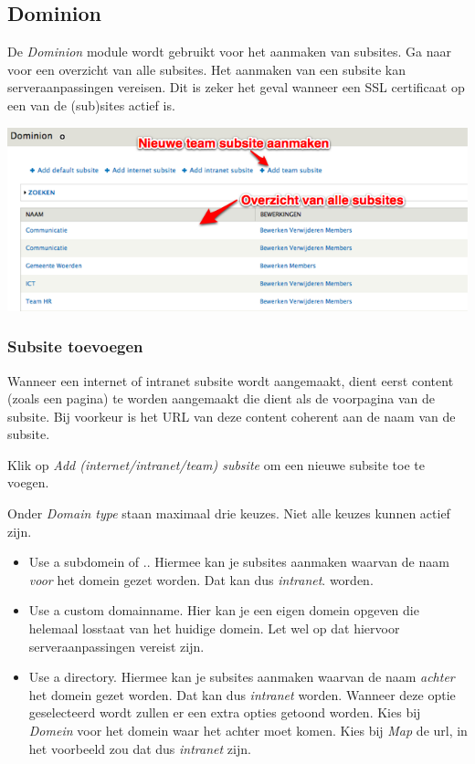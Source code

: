 \subsection{Dominion}\label{dominion}
De \emph{Dominion} module wordt gebruikt voor het aanmaken van subsites. Ga naar  voor een overzicht van alle subsites. Het aanmaken van een subsite kan serveraanpassingen vereisen. Dit is zeker het geval wanneer een SSL certificaat op een van de (sub)sites actief is.

\bigskip

\begin{center}
	\includegraphics[width=\textwidth]{img/dominion1.png}
\end{center}

\subsubsection{Subsite toevoegen}\label{teamsubsitetoevoegen}
Wanneer een internet of intranet subsite wordt aangemaakt, dient eerst content (zoals een pagina) te worden aangemaakt die dient als de voorpagina van de subsite. Bij voorkeur is het URL van deze content coherent aan de naam van de subsite.

Klik op \emph{Add (internet/intranet/team) subsite} om een nieuwe subsite toe te voegen.

Onder \emph{Domain type} staan maximaal drie keuzes. Niet alle keuzes kunnen actief zijn.

\begin{itemize}
\item Use a subdomein of .\drupalpath{}. Hiermee kan je subsites aanmaken waarvan de naam \emph{voor} het domein gezet worden. Dat kan dus \emph{intranet}.\drupalpath{} worden.
\item Use a custom domainname. Hier kan je een eigen domein opgeven die helemaal losstaat van het huidige domein. Let wel op dat hiervoor serveraanpassingen vereist zijn.
\item Use a directory. Hiermee kan je subsites aanmaken waarvan de naam \emph{achter} het domein gezet worden. Dat kan dus \drupalpath{}\emph{intranet} worden. Wanneer deze optie geselecteerd wordt zullen er een extra opties getoond worden. Kies bij \emph{Domein} voor het domein waar het achter moet komen. Kies bij \emph{Map} de url, in het voorbeeld zou dat dus \emph{intranet} zijn. 
\end{itemize}

